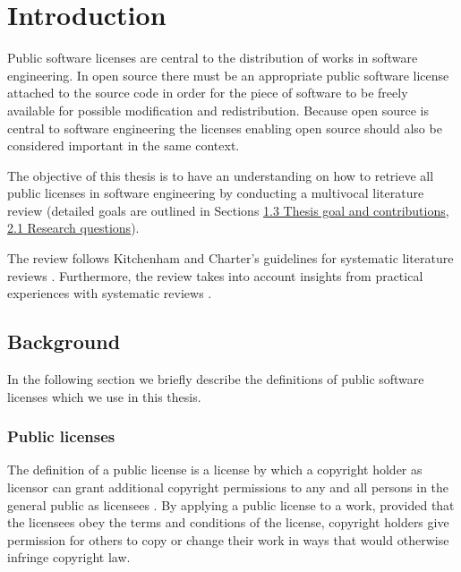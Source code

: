 \chapter{Introduction\label{intro}}
Public software licenses are central to the distribution of works in software engineering. In open source there must be an appropriate public software license attached to the source code in order for the piece of software to be freely available for possible modification and redistribution. Because open source is central to software engineering the licenses enabling open source should also be considered important in the same context.

The objective of this thesis is to have an understanding on how to retrieve all public licenses in software engineering by conducting a multivocal literature review (detailed goals are outlined in Sections \hyperref[background]{1.3 Thesis goal and contributions}, \hyperref[rqs]{2.1 Research questions}).

The review follows Kitchenham and Charter's guidelines for systematic literature reviews \citep{kitchenham2007}. Furthermore, the review takes into account insights from practical experiences with systematic reviews \citep{mahdavi-hezahevi}\citep{nurmivaara}.

\section{Background}\label{background}\label{sec:bg}
In the following section we briefly describe the definitions of public software licenses which we use in this thesis.
\subsection{Public licenses}
The definition of a public license is a license by which a copyright holder as licensor can grant additional copyright permissions to any and all persons in the general public as licensees \citep{hietanen2007license}. By applying a public license to a work, provided that the licensees obey the terms and conditions of the license, copyright holders give permission for others to copy or change their work in ways that would otherwise infringe copyright law.

